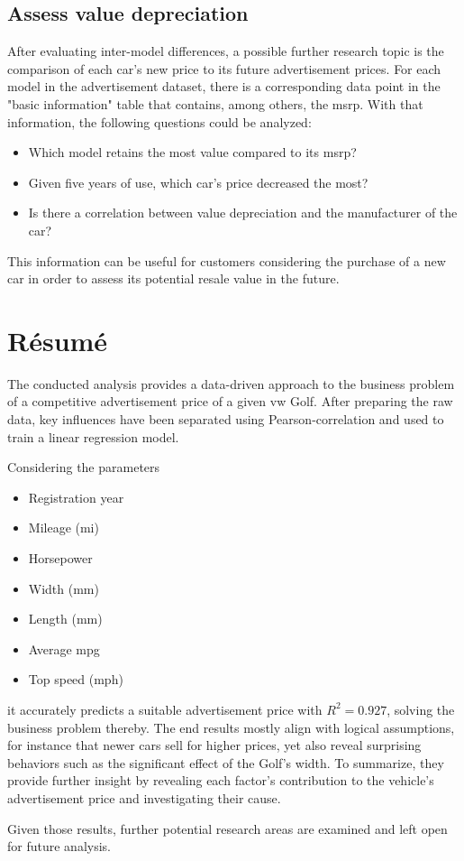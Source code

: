 \subsection{Assess value depreciation}
After evaluating inter-model differences, a possible further research topic is the comparison of each car's new price
to its future advertisement prices. For each model in the advertisement dataset, there is a corresponding data point
in the "basic information" table that contains, among others, the \ac{msrp}. 
\newline
With that information, the following questions could be analyzed: 
\begin{itemize}
\item Which model retains the most value compared to its \ac{msrp}?
\item Given five years of use, which car's price decreased the most?
\item Is there a correlation between value depreciation and the manufacturer of the car?
\end{itemize}
This information can be useful for customers considering the purchase of a new car in order to assess its potential resale value in the future.

\section{Résumé}

The conducted analysis provides a data-driven approach to the business problem of a competitive advertisement price of a given \ac{vw} Golf.
After preparing the raw data, key influences have been separated using Pearson-correlation and used to train a linear regression model.
\par
Considering the parameters 
\begin{itemize}
    \item Registration year
    \item Mileage (mi)
    \item Horsepower
    \item Width (mm)
    \item Length (mm)
    \item Average mpg
    \item Top speed (mph)
\end{itemize}
it accurately predicts a suitable advertisement price with $R^2 = 0.927$, solving the business problem thereby.
The end results mostly align with logical assumptions, for instance that newer cars sell for higher prices, yet also reveal
surprising behaviors such as the significant effect of the Golf's width.
To summarize, they provide further insight by revealing each factor's contribution to the vehicle's advertisement price and investigating their cause.
\par
Given those results, further potential research areas are examined and left open for future analysis. 

